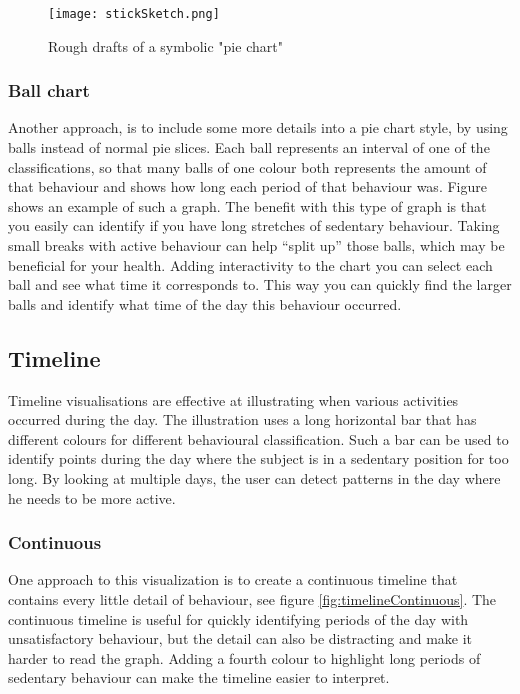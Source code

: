 \begin{figure}[h!]
	\centering
		\texttt{[image: stickSketch.png]}
		\caption{\footnotesize Rough drafts of a symbolic "pie chart"}
		\label{fig:symbolicPie}
\end{figure}

\subsubsection{Ball chart}
Another approach, is to include some more details into a pie chart style, by using balls instead of normal pie slices. Each ball represents an interval of one of the classifications, so that many balls of one colour both represents the amount of that behaviour and shows how long each period of that behaviour was. Figure %
shows an example of such a graph. The benefit with this type of graph is that you easily can identify if you have long stretches of sedentary behaviour. Taking small breaks with active behaviour can help ``split up'' those balls, which may be beneficial for your health. Adding interactivity to the chart you can select each ball and see what time it corresponds to. This way you can quickly find the larger balls and identify what time of the day this behaviour occurred. 

\subsection{Timeline}
Timeline visualisations are effective at illustrating when various activities occurred during the day. The illustration uses a long horizontal bar that has different colours for different behavioural classification. Such a bar can be used to identify points during the day where the subject is in a sedentary position for too long. By looking at multiple days, the user can detect patterns in the day where he needs to be more active.

\subsubsection{Continuous}
One approach to this visualization is to create a continuous timeline that contains every little detail of behaviour, see figure \ref{fig:timelineContinuous}. The continuous timeline is useful for quickly identifying periods of the day with unsatisfactory behaviour, but the detail can also be distracting and make it harder to read the graph. Adding a fourth colour to highlight long periods of sedentary behaviour can make the timeline easier to interpret.

